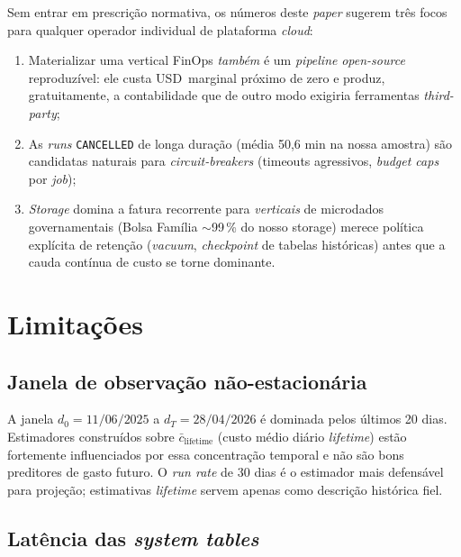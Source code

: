 \documentclass[12pt,a4paper,oneside]{article}
\begin{document}
Sem entrar em prescrição normativa, os números deste
\textit{paper} sugerem três focos para qualquer operador
individual de plataforma \textit{cloud}:

\begin{enumerate}\setlength{\itemsep}{2pt}
  \item Materializar uma vertical FinOps \textit{também} é um
        \textit{pipeline} \textit{open-source} reproduzível: ele
        custa USD~marginal próximo de zero e produz, gratuitamente,
        a contabilidade que de outro modo exigiria ferramentas
        \textit{third-party};
  \item As \textit{runs} \texttt{CANCELLED} de longa duração
        (média 50,6 min na nossa amostra) são candidatas naturais
        para \textit{circuit-breakers} (timeouts agressivos,
        \textit{budget caps} por \textit{job});
  \item \textit{Storage} domina a fatura recorrente para
        \textit{verticais} de microdados governamentais (Bolsa
        Família \(\sim\)99\,\% do nosso storage) \textemdash{}
        merece política explícita de retenção (\textit{vacuum},
        \textit{checkpoint} de tabelas históricas) antes que a
        cauda contínua de custo se torne dominante.
\end{enumerate}

\section{Limitações}\label{sec:limits}

\subsection{Janela de observação não-estacionária}

A janela \(d_0 = 11/06/2025\) a \(d_T = 28/04/2026\) é dominada
pelos últimos 20 dias. Estimadores construídos sobre
\(\bar{c}_{\text{lifetime}}\) (custo médio diário \textit{lifetime})
estão fortemente influenciados por essa concentração temporal e
não são bons preditores de gasto futuro. O \textit{run rate} de 30
dias é o estimador mais defensável para projeção; estimativas
\textit{lifetime} servem apenas como descrição histórica fiel.

\subsection{Latência das \textit{system tables}}
\end{document}
